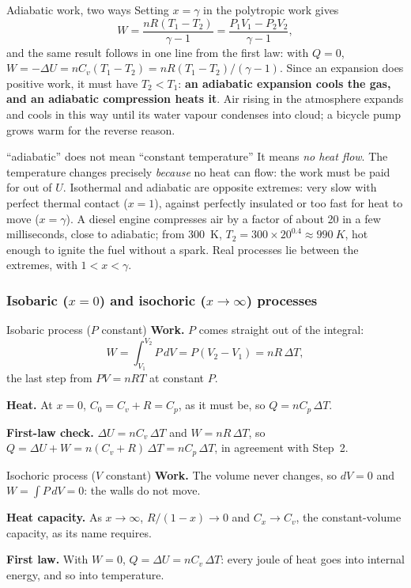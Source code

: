 \begin{keybox}{Adiabatic work, two ways}\label{key:adiawork}
Setting $x=\gamma$ in the polytropic work gives
\[
W=\frac{nR(T_1-T_2)}{\gamma-1}=\frac{P_1V_1-P_2V_2}{\gamma-1},
\]
and the same result follows in one line from the first law: with $Q=0$,
$W=-\Delta U=nC_v(T_1-T_2)=nR(T_1-T_2)/(\gamma-1)$. Since an expansion does positive work, it must have
$T_2<T_1$: \textbf{an adiabatic expansion cools the gas, and an adiabatic compression heats it}. Air rising
in the atmosphere expands and cools in this way until its water vapour condenses into cloud; a bicycle
pump grows warm for the reverse reason.
\end{keybox}

\begin{trapbox}{``adiabatic'' does not mean ``constant temperature''}
It means \emph{no heat flow}. The temperature changes precisely \emph{because} no heat can flow: the work
must be paid for out of $U$. Isothermal and adiabatic are opposite extremes: very slow with perfect thermal
contact ($x=1$), against perfectly insulated or too fast for heat to move ($x=\gamma$). A diesel engine
compresses air by a factor of about 20 in a few milliseconds, close to adiabatic; from \SI{300}{K},
$T_2=300\times20^{0.4}\approx\SI{990}{K}$, hot enough to ignite the fuel without a spark. Real
processes lie between the extremes, with $1<x<\gamma$.
\end{trapbox}

\subsubsection{Isobaric (\texorpdfstring{$x=0$}{x = 0}) and isochoric (\texorpdfstring{$x\to\infty$}{x to infinity}) processes}

\begin{derivbox}{Isobaric process (\texorpdfstring{$P$}{P} constant)}\label{der:isobaric}
 \textbf{Work.} $P$ comes straight out of the integral:
\[ W=\int_{V_1}^{V_2}P\,dV=P(V_2-V_1)=nR\,\Delta T, \]
the last step from $PV=nRT$ at constant $P$.

 \textbf{Heat.} At $x=0$, $C_0=C_v+R=C_p$, as it must be, so $Q=nC_p\,\Delta T$.

 \textbf{First-law check.} $\Delta U=nC_v\,\Delta T$ and $W=nR\,\Delta T$, so
$Q=\Delta U+W=n(C_v+R)\,\Delta T=nC_p\,\Delta T$, in agreement with Step~2.
\end{derivbox}

\begin{derivbox}{Isochoric process (\texorpdfstring{$V$}{V} constant)}\label{der:isochoric}
 \textbf{Work.} The volume never changes, so $dV=0$ and $W=\int P\,dV=0$: the walls do not move.

 \textbf{Heat capacity.} As $x\to\infty$, $R/(1-x)\to0$ and $C_x\to C_v$, the constant-volume
capacity, as its name requires.

 \textbf{First law.} With $W=0$, $Q=\Delta U=nC_v\,\Delta T$: every joule of heat goes into
internal energy, and so into temperature.
\end{derivbox}

